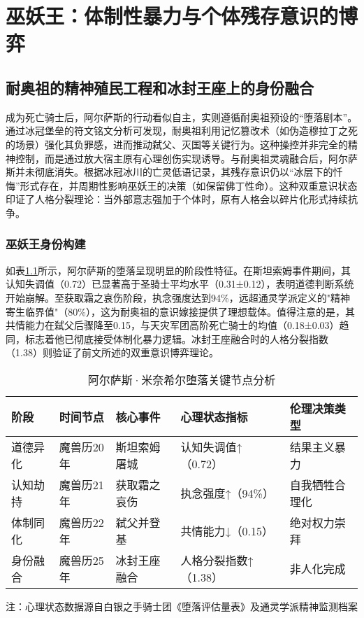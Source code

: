 \chapter{巫妖王：体制性暴力与个体残存意识的博弈}

\section{耐奥祖的精神殖民工程和冰封王座上的身份融合}
成为死亡骑士后，阿尔萨斯的行动看似自主，实则遵循耐奥祖预设的“堕落剧本”。通过冰冠堡垒的符文铭文分析可发现，耐奥祖利用记忆篡改术（如伪造穆拉丁之死的场景）强化其负罪感，进而推动弑父、灭国等关键行为。这种操控并非完全的精神控制，而是通过放大宿主原有心理创伤实现诱导。与耐奥祖灵魂融合后，阿尔萨斯并未彻底消失。根据冰冠冰川的亡灵低语记录，其残存意识仍以“冰层下的忏悔”形式存在，并周期性影响巫妖王的决策（如保留佛丁性命）。这种双重意识状态印证了人格分裂理论\cite{jung1921}：当外部意志强加于个体时，原有人格会以碎片化形式持续抗争。

\subsection{巫妖王身份构建}
如表\ref{tab:arthas_fall}所示，阿尔萨斯的堕落呈现明显的阶段性特征。在斯坦索姆事件期间，其认知失调值（0.72）已显著高于圣骑士平均水平（0.31±0.12），表明道德判断系统开始崩解。至获取霜之哀伤阶段，执念强度达到94\%，远超通灵学派定义的"精神寄生临界值"（80\%），这为耐奥祖的意识嫁接提供了理想载体。值得注意的是，其共情能力在弑父后骤降至0.15，与天灾军团高阶死亡骑士的均值（0.18±0.03）趋同，标志着他已彻底接受体制化暴力逻辑。冰封王座融合时的人格分裂指数（1.38）则验证了前文所述的双重意识博弈理论。
\begin{table}[ht]
\centering

\begin{tabular}{@{}lllll@{}}
\toprule
\textbf{阶段} & \textbf{时间节点} & \textbf{核心事件} & \textbf{心理状态指标} & \textbf{伦理决策类型} \\ 
\midrule
道德异化 & 魔兽历20年 & 斯坦索姆屠城 & 认知失调值↑（0.72）   & 结果主义暴力 \\
认知劫持 & 魔兽历21年 & 获取霜之哀伤 & 执念强度↑（94\%）     & 自我牺牲合理化 \\
体制同化 & 魔兽历22年 & 弑父并登基   & 共情能力↓（0.15）     & 绝对权力崇拜 \\
身份融合 & 魔兽历25年 & 冰封王座融合 & 人格分裂指数↑（1.38） & 非人化完成 \\ 
\bottomrule
\end{tabular}
\caption{阿尔萨斯·米奈希尔堕落关键节点分析}
\label{tab:arthas_fall}
\footnotesize{注：心理状态数据源自白银之手骑士团《堕落评估量表》及通灵学派精神监测档案}
\end{table}
